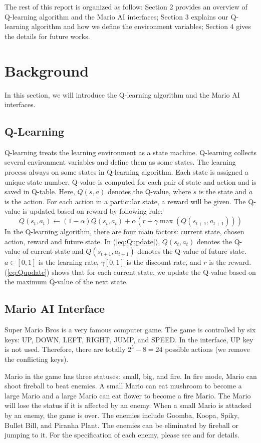 The rest of this report is organized as follow: Section 2 provides an overview of Q-learning algorithm and the Mario AI interfaces; Section 3 explains our Q-learning algorithm and how we define the environment variables; Section 4 gives the details for future works.

\section{Background}
In this section, we will introduce the Q-learning algorithm and the Mario AI interfaces.

\subsection{Q-Learning}
Q-learning treats the learning environment as a state machine. Q-learning collects several environment variables and define them as some states. The learning process always on some states in Q-learning algorithm. Each state is assigned a unique state number. Q-value is computed for each pair of state and action and is saved in Q-table. Here, $Q(s,a)$ denotes the Q-value, where $s$ is the state and $a$ is the action. For each action in a particular state, a reward will be given. The Q-value is updated based on reward by following rule:
\begin{equation}
\label{eq:Qupdate}
Q(s_t,a_t) \leftarrow (1-\alpha)Q(s_t,a_t) + \alpha(r+\gamma\max(Q(s_{t+1},a_{t+1})))
\end{equation}
In the Q-learning algorithm, there are four main factors: current state, chosen action, reward and future state. In (\ref{eq:Qupdate}), $Q(s_t,a_t)$ denotes the Q-value of current state and $Q(s_{t+1},a_{t+1})$ denotes the Q-value of future state. $a \in \left[0,1\right]$ is the learning rate, $\gamma \left[0,1\right]$ is the discount rate, and $r$ is the reward. (\ref{eq:Qupdate}) shows that for each current state, we update the Q-value based on the maximum Q-value of the next state.

\subsection{Mario AI Interface}
Super Mario Bros is a very famous computer game. The game is controlled by six keys: UP, DOWN, LEFT, RIGHT, JUMP, and SPEED. In the interface, UP key is not used. Therefore, there are totally $2^5-8 = 24$ possible actions (we remove the conflicting keys).

Mario in the game has three statuses: small, big, and fire. In fire mode, Mario can shoot fireball to beat enemies. A small Mario can eat mushroom to become a large Mario and a large Mario can eat flower to become a fire Mario. The Mario will lose the status if it is affected by an enemy. When a small Mario is attacked by an enemy, the game is over. The enemies include Goomba, Koopa, Spiky, Bullet Bill, and Piranha Plant. The enemies can be eliminated by fireball or jumping to it. For the specification of each enemy, please see \cite{tsay2011evolving} and \cite{togelius20102009} for details.

